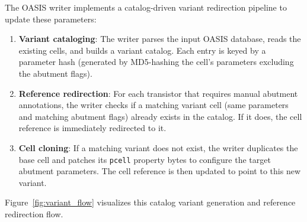 The OASIS writer implements a catalog-driven variant redirection pipeline to update these parameters:
\begin{enumerate}
    \item \textbf{Variant cataloging}: The writer parses the input OASIS database, reads the existing cells, and builds a variant catalog. Each entry is keyed by a parameter hash (generated by MD5-hashing the cell's parameters excluding the abutment flags).
    \item \textbf{Reference redirection}: For each transistor that requires manual abutment annotations, the writer checks if a matching variant cell (same parameters and matching abutment flags) already exists in the catalog. If it does, the cell reference is immediately redirected to it.
    \item \textbf{Cell cloning}: If a matching variant does not exist, the writer duplicates the base cell and patches its \texttt{pcell} property bytes to configure the target abutment parameters. The cell reference is then updated to point to this new variant.
\end{enumerate}

Figure~\ref{fig:variant_flow} visualizes this catalog variant generation and reference redirection flow.

